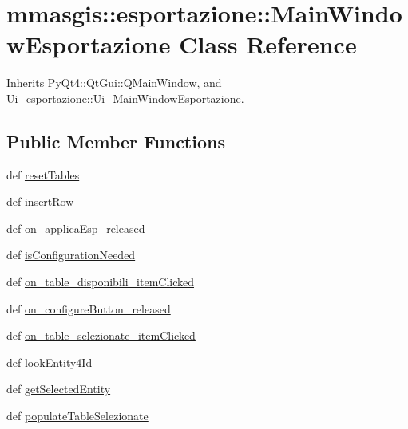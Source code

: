 \hypertarget{classmmasgis_1_1esportazione_1_1MainWindowEsportazione}{
\section{mmasgis::esportazione::MainWindowEsportazione Class Reference}
\label{classmmasgis_1_1esportazione_1_1MainWindowEsportazione}
}


Inherits PyQt4::QtGui::QMainWindow, and Ui\_\-esportazione::Ui\_\-MainWindowEsportazione.

\subsection*{Public Member Functions}
\begin{DoxyCompactItemize}
\item 
def \hyperlink{classmmasgis_1_1esportazione_1_1MainWindowEsportazione_a2d2ad2885b955f22c0e5a25db0c81c70}{resetTables}
\item 
def \hyperlink{classmmasgis_1_1esportazione_1_1MainWindowEsportazione_ac002522781126c7db9e94929b08e0f0e}{insertRow}
\item 
def \hyperlink{classmmasgis_1_1esportazione_1_1MainWindowEsportazione_a269d843a2150f71ff5ee5988aca9381a}{on\_\-applicaEsp\_\-released}
\item 
def \hyperlink{classmmasgis_1_1esportazione_1_1MainWindowEsportazione_abbeb94142e3f315f5628c6de0385e963}{isConfigurationNeeded}
\item 
def \hyperlink{classmmasgis_1_1esportazione_1_1MainWindowEsportazione_a63a6584db42a9bb5b0efaee56c3a5642}{on\_\-table\_\-disponibili\_\-itemClicked}
\item 
def \hyperlink{classmmasgis_1_1esportazione_1_1MainWindowEsportazione_a9d300d279e5612c4cee29b21fefa9594}{on\_\-configureButton\_\-released}
\item 
def \hyperlink{classmmasgis_1_1esportazione_1_1MainWindowEsportazione_a96f91b6c1c433456edbc277e5e7691b4}{on\_\-table\_\-selezionate\_\-itemClicked}
\item 
def \hyperlink{classmmasgis_1_1esportazione_1_1MainWindowEsportazione_a4b1daf3e6b1c5fbafcb65f5bc2e70418}{lookEntity4Id}
\item 
def \hyperlink{classmmasgis_1_1esportazione_1_1MainWindowEsportazione_aa81c795c60ed08925fd12156d79f0740}{getSelectedEntity}
\item 
def \hyperlink{classmmasgis_1_1esportazione_1_1MainWindowEsportazione_af26b446af7deed098344466697c0218d}{populateTableSelezionate}

\end{DoxyCompactItemize}
